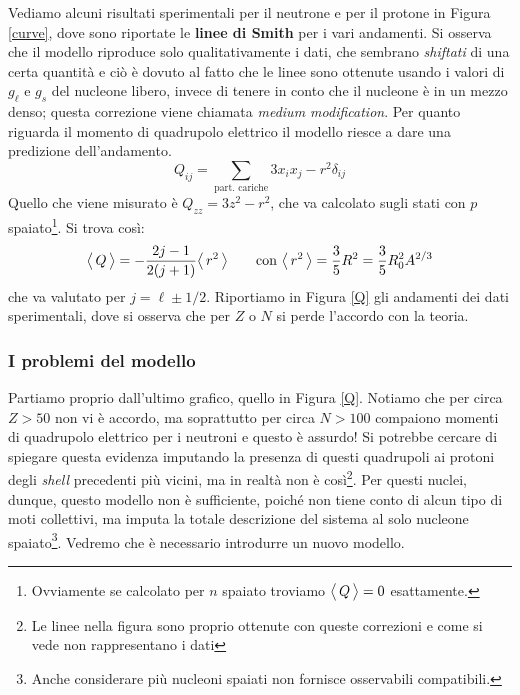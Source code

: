 Vediamo alcuni risultati sperimentali per il neutrone e per il protone in Figura \ref{curve}, dove sono riportate le \textbf{linee di Smith} per i vari andamenti. Si osserva che il modello riproduce solo qualitativamente i dati, che sembrano \textit{shiftati} di una certa quantità e ciò è dovuto al fatto che le linee sono ottenute usando i valori di $g_\ell$ e $g_s$ del nucleone libero, invece di tenere in conto che il nucleone è  in un mezzo denso; questa correzione viene chiamata \textit{medium modification}.
Per quanto riguarda il momento di quadrupolo elettrico il modello riesce a dare una predizione dell'andamento.
$$Q_{ij} = \sum_\text{part. cariche} 3x_ix_j -r^2\delta_{ij}$$
Quello che viene misurato è $Q_{zz} = 3z^2 - r^2$, che va calcolato sugli stati con $p$ spaiato\footnote{Ovviamente se calcolato per $n$ spaiato troviamo $\bigl\langle\, Q\, \bigr\rangle = 0$ esattamente.}. Si trova così:
$$\bigl\langle\, Q\, \bigr\rangle = -\frac{2j-1}{2(j+1)}\bigl\langle\, r^2\, \bigr\rangle\qquad \text{con } \bigl\langle\, r^2\, \bigr\rangle = \frac{3}{5}R^2 =\frac{3}{5}R_0^2A^{2/3}$$
che va valutato per $j=\ell\pm 1/2$. Riportiamo in Figura \ref{Q} gli andamenti dei dati sperimentali, dove si osserva che per $Z$ o $N$  si perde l'accordo con la teoria.

\subsubsection{I problemi del modello} 
Partiamo proprio dall'ultimo grafico, quello in Figura \ref{Q}. Notiamo che per circa $Z>50$ non vi è accordo, ma soprattutto per circa $N>100$ compaiono momenti di quadrupolo elettrico per i neutroni e questo è assurdo! Si potrebbe cercare di spiegare questa evidenza imputando la presenza di questi quadrupoli ai protoni degli \textit{shell} precedenti più vicini, ma in realtà non è così\footnote{Le linee nella figura sono proprio ottenute con queste correzioni e come si vede non rappresentano i dati}. Per questi nuclei, dunque, questo modello non è sufficiente, poiché non tiene conto di alcun tipo di moti collettivi, ma imputa la totale descrizione del sistema al solo nucleone spaiato\footnote{Anche considerare più nucleoni spaiati non fornisce osservabili compatibili.}. Vedremo che è necessario introdurre un nuovo modello.

